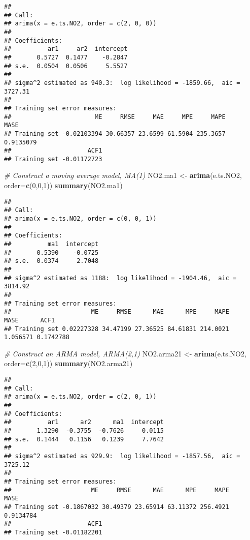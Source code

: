 \documentclass[
]{article}
\newenvironment{Shaded}{\begin{snugshade}}{\end{snugshade}}
\newcommand{\CommentTok}[1]{\textcolor[rgb]{0.56,0.35,0.01}{\textit{#1}}}
\newcommand{\DataTypeTok}[1]{\textcolor[rgb]{0.13,0.29,0.53}{#1}}
\newcommand{\DecValTok}[1]{\textcolor[rgb]{0.00,0.00,0.81}{#1}}
\newcommand{\KeywordTok}[1]{\textcolor[rgb]{0.13,0.29,0.53}{\textbf{#1}}}
\newcommand{\NormalTok}[1]{#1}
\newcommand{\StringTok}[1]{\textcolor[rgb]{0.31,0.60,0.02}{#1}}
\begin{document}
\begin{verbatim}
## 
## Call:
## arima(x = e.ts.NO2, order = c(2, 0, 0))
## 
## Coefficients:
##          ar1     ar2  intercept
##       0.5727  0.1477    -0.2847
## s.e.  0.0504  0.0506     5.5527
## 
## sigma^2 estimated as 940.3:  log likelihood = -1859.66,  aic = 3727.31
## 
## Training set error measures:
##                       ME     RMSE     MAE     MPE     MAPE      MASE
## Training set -0.02103394 30.66357 23.6599 61.5904 235.3657 0.9135079
##                     ACF1
## Training set -0.01172723
\end{verbatim}

\begin{Shaded}
\begin{Highlighting}[]
\CommentTok{# Construct a moving average model, MA(1)}
\NormalTok{NO2.ma1 <-}\StringTok{ }\KeywordTok{arima}\NormalTok{(e.ts.NO2, }\DataTypeTok{order=}\KeywordTok{c}\NormalTok{(}\DecValTok{0}\NormalTok{,}\DecValTok{0}\NormalTok{,}\DecValTok{1}\NormalTok{))}
\KeywordTok{summary}\NormalTok{(NO2.ma1)}
\end{Highlighting}
\end{Shaded}

\begin{verbatim}
## 
## Call:
## arima(x = e.ts.NO2, order = c(0, 0, 1))
## 
## Coefficients:
##          ma1  intercept
##       0.5390    -0.0725
## s.e.  0.0374     2.7048
## 
## sigma^2 estimated as 1188:  log likelihood = -1904.46,  aic = 3814.92
## 
## Training set error measures:
##                      ME     RMSE      MAE      MPE     MAPE     MASE      ACF1
## Training set 0.02227328 34.47199 27.36525 84.61831 214.0021 1.056571 0.1742788
\end{verbatim}

\begin{Shaded}
\begin{Highlighting}[]
\CommentTok{# Construct an ARMA model, ARMA(2,1)}
\NormalTok{NO2.arma21 <-}\StringTok{ }\KeywordTok{arima}\NormalTok{(e.ts.NO2, }\DataTypeTok{order=}\KeywordTok{c}\NormalTok{(}\DecValTok{2}\NormalTok{,}\DecValTok{0}\NormalTok{,}\DecValTok{1}\NormalTok{))}
\KeywordTok{summary}\NormalTok{(NO2.arma21)}
\end{Highlighting}
\end{Shaded}

\begin{verbatim}
## 
## Call:
## arima(x = e.ts.NO2, order = c(2, 0, 1))
## 
## Coefficients:
##          ar1      ar2      ma1  intercept
##       1.3290  -0.3755  -0.7626     0.0115
## s.e.  0.1444   0.1156   0.1239     7.7642
## 
## sigma^2 estimated as 929.9:  log likelihood = -1857.56,  aic = 3725.12
## 
## Training set error measures:
##                      ME     RMSE      MAE      MPE     MAPE      MASE
## Training set -0.1867032 30.49379 23.65914 63.11372 256.4921 0.9134784
##                     ACF1
## Training set -0.01182201
\end{verbatim}
\end{document}
